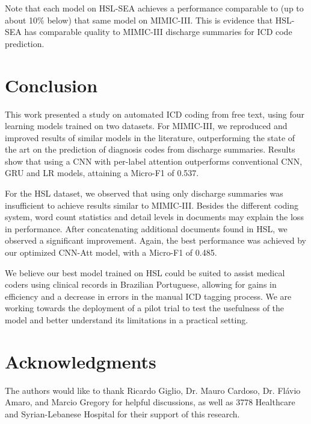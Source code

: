 \documentclass[runningheads]{llncs}
\def\FINAL{}
\begin{document}
Note that each model on HSL-SEA achieves a performance comparable to (up to about 10\% below) that same model on MIMIC-III. This is evidence that HSL-SEA has comparable quality to MIMIC-III discharge summaries for ICD code prediction.


\section{Conclusion}

This work presented a study on automated ICD coding from free text, using four learning models trained on two datasets. For MIMIC-III, we reproduced and improved results of similar models in the literature, outperforming the state of the art on the prediction of diagnosis codes from discharge summaries. Results show that using a CNN with per-label attention outperforms conventional CNN, GRU and LR models, attaining a Micro-F1 of 0.537.

For the HSL dataset, we observed that using only discharge summaries was insufficient to achieve results similar to MIMIC-III. Besides the different coding system, word count statistics and detail levels in documents may explain the loss in performance. After concatenating additional documents found in HSL, we observed a significant improvement. Again, the best performance was achieved by our optimized CNN-Att model, with a Micro-F1 of 0.485.

We believe our best model trained on HSL could be suited to assist medical coders using clinical records in Brazilian Portuguese, allowing for gains in efficiency and a decrease in errors in the manual ICD tagging process. We are working towards the deployment of a pilot trial to test the usefulness of the model and better understand its limitations in a practical setting.

\ifdefined\FINAL

\section*{Acknowledgments}

The authors would like to thank Ricardo Giglio, Dr. Mauro Cardoso, Dr. Flávio Amaro, and Marcio Gregory for helpful discussions, as well as 3778 Healthcare and Syrian-Lebanese Hospital for their support of this research.

\fi



\end{document}
